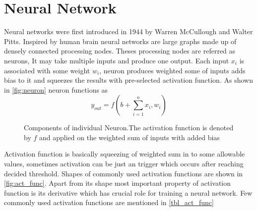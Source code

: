 \section{Neural Network}
Neural networks were first introduced  in 1944 by Warren McCullough and Walter Pitts. Inspired by human brain neural networks are large graphs made up of densely connected processing nodes. Theses processing nodes are referred as neurons, It may take multiple inputs and produce one output. Each input $x_i$ is associated with some weight $w_i$, neuron produces weighted some of inputs adds bias to it and squeezes the results with pre-selected activation function. As shown in \autoref{fig:neuron} neuron functions as
\begin{equation}
    y_{out} = f(b+\sum ^{n}_{i=1} x_i,w_i)
\end{equation}
\begin{figure}[H]
    \centering
    
    \caption{Components of individual Neuron.The activation function is denoted by $f$ and applied on the weighted sum of inputs with added bias}
    \label{fig:neuron}
\end{figure}
\noindent Activation function is basically squeezing of weighted sum in to some allowable values, sometimes activation can be just an trigger which occurs after reaching decided threshold. Shapes of commonly used activation functions are shown in \autoref{fig:act_func}. Apart from its shape most important property of activation function is its derivative which has crucial role for training a neural network. Few commonly used activation functions are mentioned in \autoref{tbl_act_func}

